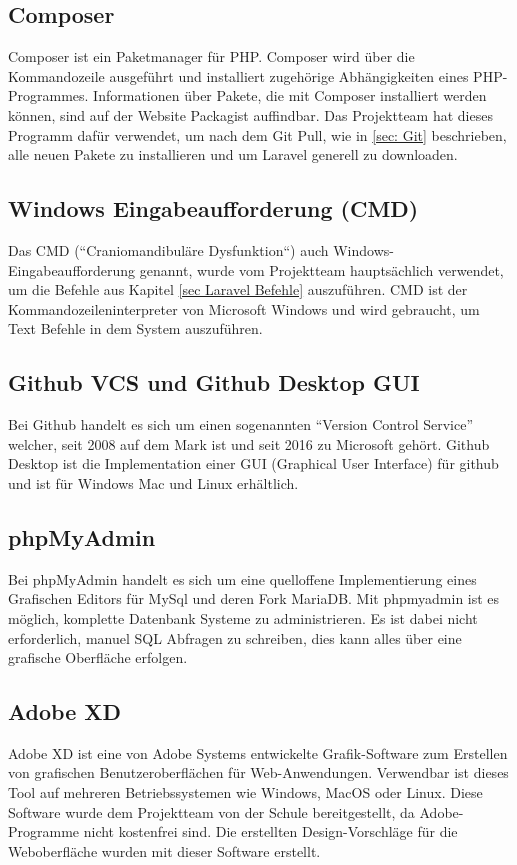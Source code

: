 \subsection{Composer}
Composer ist ein Paketmanager für PHP. Composer wird über die Kommandozeile ausgeführt und installiert zugehörige Abhängigkeiten eines PHP-Programmes. Informationen über Pakete, die mit Composer installiert werden können, sind auf der Website Packagist auffindbar. Das Projektteam hat dieses Programm dafür verwendet, um nach dem Git Pull, wie in \ref{sec: Git} beschrieben, alle neuen Pakete zu installieren und um Laravel generell zu downloaden.
\subsection{Windows Eingabeaufforderung (CMD)}
Das CMD (“Craniomandibuläre Dysfunktion“) auch Windows-Eingabeaufforderung genannt, wurde vom Projektteam hauptsächlich verwendet, um die Befehle aus Kapitel \ref{sec Laravel Befehle} auszuführen. CMD ist der Kommandozeileninterpreter von Microsoft Windows und wird gebraucht, um Text Befehle in dem System auszuführen. 
\subsection{Github VCS und Github Desktop GUI}
Bei Github handelt es sich um einen sogenannten “Version Control Service” welcher, seit 2008 auf dem Mark ist und seit 2016 zu Microsoft gehört. Github Desktop ist die Implementation einer GUI (Graphical User Interface) für github und ist für Windows Mac und Linux erhältlich.

\newpage
\subsection{ phpMyAdmin}
Bei phpMyAdmin handelt es sich um eine quelloffene Implementierung eines Grafischen Editors für MySql und deren Fork MariaDB. Mit phpmyadmin ist es möglich, komplette Datenbank Systeme zu administrieren. Es ist dabei nicht erforderlich, manuel SQL Abfragen zu schreiben, dies kann alles über eine grafische Oberfläche erfolgen.  
\subsection{Adobe XD}
Adobe XD ist eine von Adobe Systems entwickelte Grafik-Software zum Erstellen von grafischen Benutzeroberflächen für Web-Anwendungen. Verwendbar ist dieses Tool auf mehreren Betriebssystemen wie Windows, MacOS oder Linux. Diese Software wurde dem Projektteam von der Schule bereitgestellt, da Adobe-Programme nicht kostenfrei sind. Die erstellten Design-Vorschläge für die Weboberfläche wurden mit dieser Software erstellt. 


